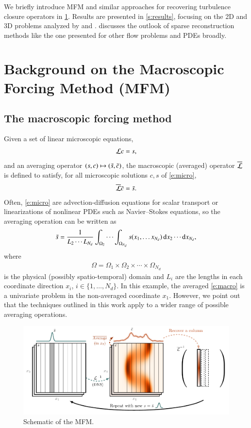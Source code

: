 We briefly introduce MFM and similar approaches for recovering turbulence closure operators in \cref{s:mfm}.
Results are presented in \cref{s:results}, focusing on the 2D and 3D problems analyzed by \citet{maniMacroscopicForcingMethod2021} and \citet{park21}.
 discusses the outlook of sparse reconstruction methods like the one presented for other flow problems and PDEs broadly.

\section{Background on the Macroscopic Forcing Method (MFM)}\label{s:mfm}

\subsection{The macroscopic forcing method}

Given a set of linear microscopic equations,
\begin{gather}
    \mathcal{L} c = s,
    \label{e:micro}
\end{gather}
and an averaging operator $(s, c) \mapsto (\bar{s}, \bar{c})$, the macroscopic (averaged) operator $\overline{\mathcal{L}}$ is defined to satisfy, for all microscopic solutions $c, s$ of \eqref{e:micro}, 
\begin{gather}
    \overline{\mathcal{L}} \bar{c} = \bar{s}.
    \label{e:macro}
\end{gather}
Often, \eqref{e:micro} are advection-diffusion equations for scalar transport or linearizations of nonlinear PDEs such as Navier--Stokes equations, so the averaging operation can be written as 
\begin{gather}
    \bar{s} = \frac{1}{L_2 \cdots L_{N_d}}\int_{\Omega_{2}} \cdots \int_{\Omega_{N_d}} s(x_1, \ldots x_{N_d}) \, \text{d} x_2 \cdots \text{d} x_{N_d},
\end{gather}
where 
\begin{gather}
    \Omega = \Omega_{1} \times \Omega_{2} \times \cdots \times \Omega_{N_d}
\end{gather}
is the physical (possibly spatio-temporal) domain and $L_i$ are the lengths in each coordinate direction $x_i$, $i \in \{1,\dots,N_d\}$.
In this example, the averaged \eqref{e:macro} is a univariate problem in the non-averaged coordinate $x_1$. 
However, we point out that the techniques outlined in this work apply to a wider range of possible averaging operations.

\begin{figure}[H]
    \centering
    \includegraphics[scale=1]{figures/overview.pdf}
    \caption{
        Schematic of the MFM. 
    }
    \label{f:overview}
\end{figure}

